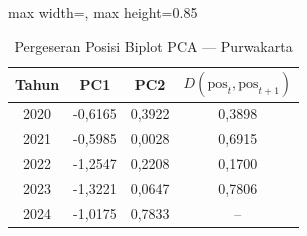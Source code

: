 \begin{table}[H]
\centering
\caption{Pergeseran Posisi Biplot PCA --- Purwakarta} \label{tab:appjarak_pca_skor_purwakarta}
\begin{adjustbox}{max width=\textwidth, max height=0.85\textheight}
\begin{tabular}{|c|c|c|c|}
\hline
\textbf{Tahun} & \textbf{PC1} & \textbf{PC2} & \textbf{$D(\text{pos}_t, \text{pos}_{t+1})$} \\
\hline
2020 & -0,6165 & 0,3922 & 0,3898 \\
2021 & -0,5985 & 0,0028 & 0,6915 \\
2022 & -1,2547 & 0,2208 & 0,1700 \\
2023 & -1,3221 & 0,0647 & 0,7806 \\
2024 & -1,0175 & 0,7833 & -- \\
\hline
\end{tabular}
\end{adjustbox}
\end{table}